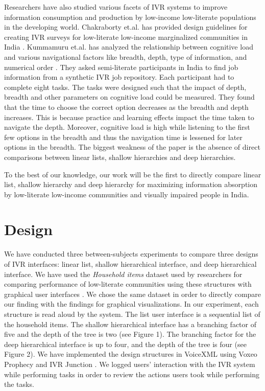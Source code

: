 \documentclass{sigchi}
\begin{document}
Researchers have also studied various facets of IVR systems to improve information consumption and production by low-income low-literate populations in the developing world. Chakraborty et.al. has provided design guidelines for creating IVR surveys for low-literate low-income marginalized communities in India \cite{Chakraborty2013}. Kummamuru et.al. has analyzed the relationship between cognitive load and various navigational factors like breadth, depth, type of information, and numerical order \cite{Kummamuru2012}. They asked semi-literate participants in India to find job information from a synthetic IVR job repository. Each participant had to complete eight tasks. The tasks were designed such that the impact of depth, breadth and other parameters on cognitive load could be measured. They found that the time to choose the correct option decreases as the breadth and depth increases. This is because practice and learning effects impact the time taken to navigate the depth. Moreover, cognitive load is high while listening to the first few options in the breadth and thus the navigation time is lessened for later options in the breadth. The biggest weakness of the paper is the absence of direct comparisons between linear lists, shallow hierarchies and deep hierarchies.

To the best of our knowledge, our work will be the first to directly compare linear list, shallow hierarchy and deep hierarchy for maximizing information absorption by low-literate low-income communities and visually impaired people in India. 

\section{Design}
We have conducted three between-subjects experiments to compare three designs of IVR interfaces: linear list, shallow hierarchical interface, and deep hierarchical interface. We have used the \textit{Household items} dataset used by researchers for comparing performance of low-literate communities using these structures with graphical user interfaces \cite{Medhi2013a,Medhi2013b}. We chose the same dataset in order to directly compare our finding with the findings for graphical visualizations. In our experiment, each structure is read aloud by the system. The list user interface is a sequential list of the household items. The shallow hierarchical interface has a branching factor of five and the depth of the tree is two (see Figure 1). The branching factor for the deep hierarchical interface is up to four, and the depth of the tree is four (see Figure 2). We have implemented the design structures in VoiceXML using Voxeo Prophecy and IVR Junction \cite{Vashistha}. We logged users' interaction with the IVR system while performing tasks in order to review the actions users took while performing the tasks.
\end{document}
